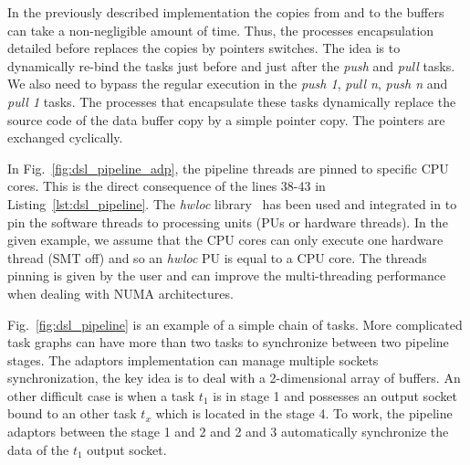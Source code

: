 
In the previously described implementation the copies from and to the buffers
can take a non-negligible amount of time. Thus, the processes encapsulation
detailed before replaces the copies by pointers switches.
The idea is to dynamically re-bind the tasks just before and just after the
\emph{push} and \emph{pull} tasks. We also need to bypass the regular execution
in the \emph{push 1}, \emph{pull n}, \emph{push n} and \emph{pull 1} tasks. The
processes that encapsulate these tasks dynamically replace the source code of
the data buffer copy by a simple pointer copy.
The pointers are exchanged cyclically.

In Fig.~\ref{fig:dsl_pipeline_adp}, the pipeline threads are pinned to specific
CPU cores. This is the direct consequence of the lines 38-43 in
Listing~\ref{lst:dsl_pipeline}. The \emph{hwloc} library~\cite{Broquedis2010}
has been used and integrated in \AFFECT to pin the software threads to
processing units (PUs or hardware threads). In the given example, we assume that
the CPU cores can only execute one hardware thread (SMT off) and so an
\emph{hwloc} PU is equal to a CPU core. The threads pinning is given by the user
and can improve the multi-threading performance when dealing with NUMA
architectures.

Fig.~\ref{fig:dsl_pipeline} is an example of a simple chain of tasks. More
complicated task graphs can have more than two tasks to synchronize between two
pipeline stages. The adaptors implementation can manage multiple sockets
synchronization, the key idea is to deal with a 2-dimensional array of buffers.
An other difficult case is when a task $t_1$ is in stage 1 and possesses an
output socket bound to an other task $t_{x}$ which is located in the stage 4.
To work, the pipeline adaptors between the stage 1 and 2 and 2 and 3
automatically synchronize the data of the $t_1$ output socket.

